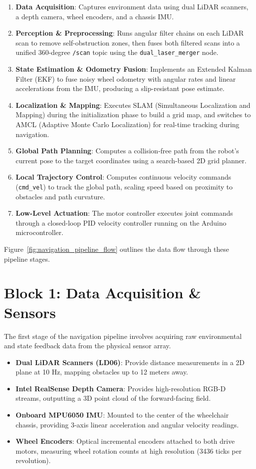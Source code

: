 \begin{enumerate}
    \item \textbf{Data Acquisition}: Captures environment data using dual LiDAR scanners, a depth camera, wheel encoders, and a chassis IMU.
    \item \textbf{Perception \& Preprocessing}: Runs angular filter chains on each LiDAR scan to remove self-obstruction zones, then fuses both filtered scans into a unified 360-degree \texttt{/scan} topic using the \texttt{dual\_laser\_merger} node.
    \item \textbf{State Estimation \& Odometry Fusion}: Implements an Extended Kalman Filter (EKF) to fuse noisy wheel odometry with angular rates and linear accelerations from the IMU, producing a slip-resistant pose estimate.
    \item \textbf{Localization \& Mapping}: Executes SLAM (Simultaneous Localization and Mapping) during the initialization phase to build a grid map, and switches to AMCL (Adaptive Monte Carlo Localization) for real-time tracking during navigation.
    \item \textbf{Global Path Planning}: Computes a collision-free path from the robot's current pose to the target coordinates using a search-based 2D grid planner.
    \item \textbf{Local Trajectory Control}: Computes continuous velocity commands (\texttt{cmd\_vel}) to track the global path, scaling speed based on proximity to obstacles and path curvature.
    \item \textbf{Low-Level Actuation}: The motor controller executes joint commands through a closed-loop PID velocity controller running on the Arduino microcontroller.
\end{enumerate}

Figure~\ref{fig:navigation_pipeline_flow} outlines the data flow through these pipeline stages.



\section{Block 1: Data Acquisition \& Sensors}

The first stage of the navigation pipeline involves acquiring raw environmental and state feedback data from the physical sensor array.

\begin{itemize}
    \item \textbf{Dual LiDAR Scanners (LD06)}: Provide distance measurements in a 2D plane at 10 Hz, mapping obstacles up to 12 meters away.
    \item \textbf{Intel RealSense Depth Camera}: Provides high-resolution RGB-D streams, outputting a 3D point cloud of the forward-facing field.
    \item \textbf{Onboard MPU6050 IMU}: Mounted to the center of the wheelchair chassis, providing 3-axis linear acceleration and angular velocity readings.
    \item \textbf{Wheel Encoders}: Optical incremental encoders attached to both drive motors, measuring wheel rotation counts at high resolution (3436 ticks per revolution).
\end{itemize}

